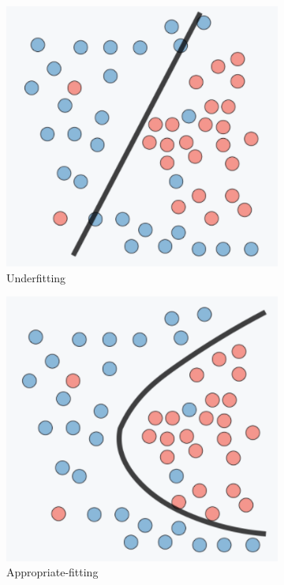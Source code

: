 \begin{figure}[H]
\begin{subfigure}{.33\textwidth}
  \centering
  \includegraphics[width=.8\linewidth]{figs/underfitting.png}
  \caption{Underfitting }
  \label{fig:Underfitting}
\end{subfigure}%
\begin{subfigure}{.33\textwidth}
  \centering
  \includegraphics[width=.8\linewidth]{figs/goodfitting.png}
  \caption{Appropriate-fitting}
  \label{fig:Appropriatefitting}
\end{subfigure}
\begin{subfigure}{.33\textwidth}
  \centering

\end{subfigure}
\end{figure}
